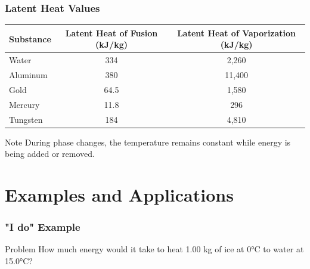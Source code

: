 \documentclass{beamer}
\begin{document}
\begin{frame}
    \frametitle{Latent Heat Values}
    \begin{center}
        \begin{tabular}{|l|c|c|}
            \hline
            \textbf{Substance} & \textbf{Latent Heat of Fusion (kJ/kg)} & \textbf{Latent Heat of Vaporization (kJ/kg)} \\
            \hline
            Water & 334 & 2,260 \\
            \hline
            Aluminum & 380 & 11,400 \\
            \hline
            Gold & 64.5 & 1,580 \\
            \hline
            Mercury & 11.8 & 296 \\
            \hline
            Tungsten & 184 & 4,810 \\
            \hline
        \end{tabular}
    \end{center}
    
    \begin{block}{Note}
        During phase changes, the temperature remains constant while energy is being added or removed.
    \end{block}
\end{frame}

\section{Examples and Applications}

\begin{frame}
    \frametitle{"I do" Example}
    \begin{block}{Problem}
        How much energy would it take to heat 1.00 kg of ice at 0°C to water at 15.0°C?
    \end{block}
    \end{frame}
\end{document}
